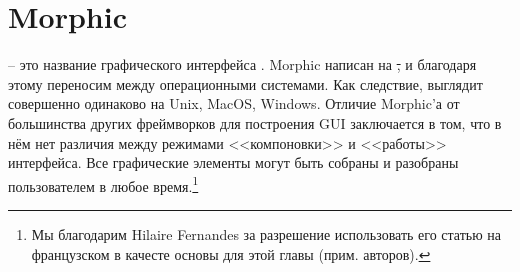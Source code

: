\documentclass[a4paper,10pt,twoside]{book}
\begin{document}
	\sloppy
\fi
\chapter{Morphic}


 -- это название графического интерфейса \pharo.
Morphic написан на \st, и благодаря этому переносим между операционными системами. Как следствие, \pharo выглядит совершенно одинаково на Unix, MacOS, Windows.
Отличие Morphic'а от большинства других фреймворков для построения GUI заключается в том, что в нём нет различия между режимами <<компоновки>> и <<работы>> интерфейса. Все графические элементы могут быть собраны и разобраны пользователем в любое время.\footnote{Мы благодарим Hilaire Fernandes за разрешение использовать его статью на французском в качесте основы для этой главы (прим. авторов).}



\end{document}
